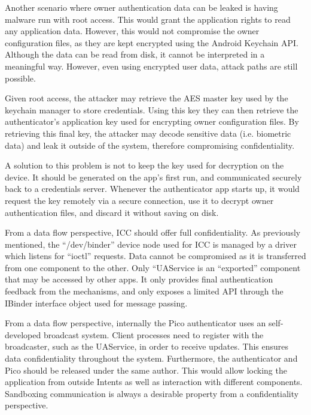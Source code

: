 Another scenario where owner authentication data can be leaked is having malware run with root access. This would grant the application rights to read any application data. However, this would not compromise the owner configuration files, as they are kept encrypted using the Android Keychain API. Although the data can be read from disk, it cannot be interpreted in a meaningful way. However, even using encrypted user data, attack paths are still possible.

 Given root access, the attacker may retrieve the AES master key used by the keychain manager to store credentials. Using this key they can then retrieve the authenticator's application key used for encrypting owner configuration files. By retrieving this final key, the attacker may decode sensitive data (i.e. biometric data) and leak it outside of the system, therefore compromising confidentiality.

A solution to this problem is not to keep the key used for decryption on the device. It should be generated on the app's first run, and communicated securely back to a credentials server. Whenever the authenticator app starts up, it would request the key remotely via a secure connection, use it to decrypt owner authentication files, and discard it without saving on disk.

From a data flow perspective, ICC should offer full confidentiality. As previously mentioned, the ``/dev/binder'' device node used for ICC is managed by a driver which listens for ``ioctl'' requests. Data cannot be compromised as it is transferred from one component to the other. Only ``UAService is an ``exported'' component that may be accessed by other apps. It only provides final authentication feedback from the mechanisms, and only exposes a limited API through the IBinder interface object used for message passing.

From a data flow perspective, internally the Pico authenticator uses an self-developed broadcast system. Client processes need to register with the broadcaster, such as the UAService, in order to receive updates. This ensures data confidentiality throughout the system. Furthermore, the authenticator and Pico should be released under the same author. This would allow locking the application from outside Intents as well as interaction with different components. Sandboxing communication is always a desirable property from a confidentiality perspective.

